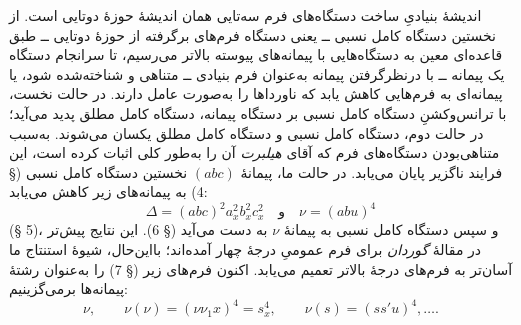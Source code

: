 \documentclass[11pt]{article}
\begin{document}
اندیشهٔ بنیادیِ ساخت دستگاه‌های فرم سه‌تایی همان اندیشهٔ حوزهٔ دوتایی است. از نخستین دستگاه کامل نسبی ــ یعنی دستگاه فرم‌های برگرفته از حوزهٔ دوتایی ــ طبق قاعده‌ای معین به دستگاه‌هایی با پیمانه‌های پیوسته بالاتر می‌رسیم، تا سرانجام دستگاه یک پیمانه ــ با درنظرگرفتن پیمانه به‌عنوان فرم بنیادی ــ متناهی و شناخته‌شده شود، یا پیمانه‌ای به فرم‌هایی کاهش یابد که ناورداها را به‌صورت عامل دارند. در حالت نخست، با ترانس‌وکشنِ دستگاه کامل نسبی بر دستگاه پیمانه، دستگاه کامل مطلق پدید می‌آید؛ در حالت دوم، دستگاه کامل نسبی و دستگاه کامل مطلق یکسان می‌شوند. به‌سبب متناهی‌بودن دستگاه‌های فرم که آقای \emph{هیلبرت} آن را به‌طور کلی اثبات کرده است، این فرایند ناگزیر پایان می‌یابد.
در حالت ما، پیمانهٔ $(abc)$ نخستین دستگاه کامل نسبی (§ 4) به پیمانه‌های زیر کاهش می‌یابد:
\[
\Delta=(abc)^2a_x^2b_x^2c_x^2\quad\text{و}\quad \nu=(abu)^4
\]
(§ 5)، و سپس دستگاه کامل نسبی به پیمانهٔ $\nu$ به دست می‌آید (§ 6). این نتایج پیش‌تر در مقالهٔ \emph{گوردان} برای فرم عمومیِ درجهٔ چهار آمده‌اند؛ بااین‌حال، شیوهٔ استنتاج ما آسان‌تر به فرم‌های درجهٔ بالاتر تعمیم می‌یابد.
اکنون فرم‌های زیر (§ 7) را به‌عنوان رشتهٔ پیمانه‌ها برمی‌گزینیم:
\[
\nu,\qquad \nu(\nu)=(\nu\nu_1x)^4=s_x^4,\qquad \nu(s)=(ss'u)^4,\ldots .
\]
\end{document}
